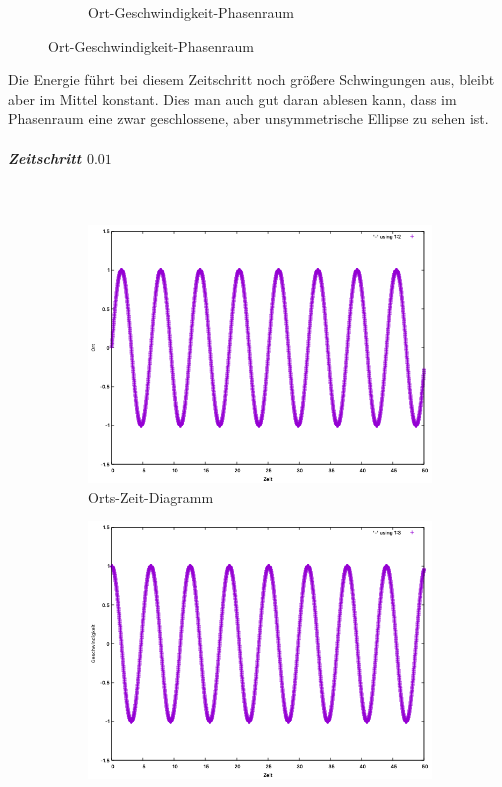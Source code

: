 \documentclass[
    oneside,
    ngerman,
    footinclude=false,
    captions=tableheading,
    DIV=12
]{scrartcl}
\begin{document}
\begin{figure}[H]
\begin{subfigure}[b]{0.45\textwidth}
                    \caption{Ort-Geschwindigkeit-Phasenraum}
                    \label{fig:expEulerA1(a)-01-0-xv}
                \end{subfigure}
                \end{figure}
                Die Energie führt bei diesem Zeitschritt noch größere Schwingungen aus, bleibt aber im Mittel konstant. Dies man auch gut daran ablesen kann, dass im Phasenraum eine zwar geschlossene, aber unsymmetrische Ellipse zu sehen ist.
                \newpage

                \subparagraph*{Zeitschritt $0.01$}\,
                \begin{figure}[H]
                    \centering
                    \begin{subfigure}[b]{0.45\textwidth}
                        \centering
                        \includegraphics[width=\textwidth]{Bilddateien/expEulerA1(a)-001h-x.png}
                        \caption{Orts-Zeit-Diagramm}
                        \label{fig:expEulerA1(a)-001-0-x}
                    \end{subfigure}
                    \hfill
                    \begin{subfigure}[b]{0.45\textwidth}
                        \centering
                        \includegraphics[width=\textwidth]{Bilddateien/expEulerA1(a)-001h-v.png}

\end{subfigure}
\end{figure}
\end{document}
